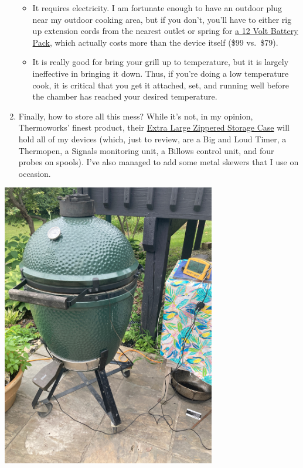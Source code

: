 \documentclass[
]{book}
\providecommand{\tightlist}{%
  \setlength{\itemsep}{0pt}\setlength{\parskip}{0pt}}
\begin{document}
\begin{enumerate}
  \begin{itemize}
  \tightlist
  \item
    It requires electricity. I am fortunate enough to have an outdoor plug near my outdoor cooking area, but if you don't, you'll have to either rig up extension cords from the nearest outlet or spring for \href{https://www.thermoworks.com/billows-12v-battery-bank/}{a 12 Volt Battery Pack}, which actually costs more than the device itself (\$99 vs.~\$79).\\
  \item
    It is really good for bring your grill up to temperature, but it is largely ineffective in bringing it down. Thus, if you're doing a low temperature cook, it is critical that you get it attached, set, and running well before the chamber has reached your desired temperature.
  \end{itemize}
\item
  Finally, how to store all this mess? While it's not, in my opinion, Thermoworks' finest product, their \href{https://www.thermoworks.com/tx-1017x-c2/}{Extra Large Zippered Storage Case} will hold all of my devices (which, just to review, are a Big and Loud Timer, a Thermopen, a Signals monitoring unit, a Billows control unit, and four probes on spools). I've also managed to add some metal skewers that I use on occasion.
\end{enumerate}

\includegraphics[width=0.7\textwidth,height=\textheight]{images/bgewithbillows.jpeg}
\end{document}
